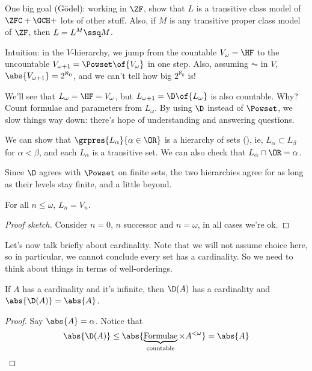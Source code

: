
One big goal (Gödel): working in $\ZF$, show that $L$ is a transitive class model of $\ZFC + \GCH +$ lots of other stuff. Also, if $M$ is any transitive proper class model of $\ZF$, then $L = L^M \ssq M$.

Intuition: in the $V$-hierarchy, we jump from the countable $V_{\omega} = \HF$ to the uncountable $V_{\omega + 1} = \Powset\of{V_{\omega}}$ in one step. Also, assuming $\AC$ in $V$, $\abs{V_{\omega + 1}} = 2^{\aleph_0}$, and we can't tell how big $2^{\aleph_0}$ is!

We'll see that $L_{\omega} = \HF = V_{\omega}$, but $L_{\omega + 1} = \D\of{L_{\omega}}$ is also countable. Why? Count formulae and parameters from $L_{\omega}$. By using $\D$ instead of $\Powset$, we slow things way down: there's hope of understanding and answering questions.

We can show that $\grpres{L_{\alpha}}{\alpha \in \OR}$ is a hierarchy of sets (), ie, $L_{\alpha} \subset L_{\beta}$ for $\alpha < \beta$, and each $L_{\alpha}$ is a transitive set. We can also check that $L_{\alpha} \cap \OR = \alpha$.

Since $\D$ agrees with $\Powset$ on finite sets, the two hierarchies agree for as long as their levels stay finite, and a little beyond.

\begin{boxcorollary}
    For all $n \leq \omega$, $L_n = V_n$.
\end{boxcorollary}
\begin{proof}[Proof sketch]
    Consider $n = 0$, $n$ successor and $n = \omega$, in all cases we're ok.
\end{proof}

Let's now talk briefly about cardinality. Note that we will not assume choice here, so in particular, we cannot conclude every set has a cardinality. So we need to think about things in terms of well-orderings.

\begin{boxlemma}
    If $A$ has a cardinality and it's infinite, then $\D(A)$ has a cardinality and $\abs{\D(A)} = \abs{A}$.
\end{boxlemma}
\begin{proof}
    Say $\abs{A} = \alpha$. Notice that
    \begin{align*}
        \abs{\D(A)} \leq \abs{\underbrace{\text{Formulae}}_{\text{countable}} \times A^{<\omega}} = \abs{A}
    \end{align*}
\end{proof}

